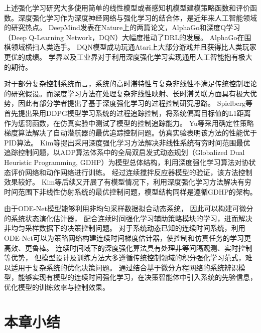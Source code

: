 上述强化学习研究大多使用简单的线性模型或者感知机模型建模策略函数和评价函数。深度强化学习作为深度神经网络与强化学习的结合体，是近年来人工智能领域的研究热点。
DeepMind发表在Nature上的两篇论文，AlphaGo\cite{silver2017mastering}和深度Q学习（Deep Q-Learning Network，DQN）\cite{mnih2015human}大幅度推动了DRL的发展。
AlphaGo在围棋领域横扫人类选手。
DQN模型成功玩通Atari上大部分游戏并且获得比人类玩家更优的成绩。
学界以及工业界对于利用深度强化学习实现通用人工智能抱有极大的期待。

对于部分复杂控制系统而言，系统的高时滞特性与复杂非线性不满足传统控制理论的研究假设。而深度学习方法在处理复杂非线性映射、长时滞关联方面具有极大优势，因此有部分学者提出了基于深度强化学习的过程控制研究思路。
Spielberg等\cite{7983780}首先提出采用DDPG模型学习系统的过程追踪控制，将系统偏离目标值的L1距离作为惩罚函数，在仿真实验中测试了模型的控制追踪能力。
Yu等\cite{yu2017deep}采用确定性策略梯度算法解决了自动潜航器的最优追踪控制问题。仿真实验表明该方法的性能优于PID算法。
Kim等\cite{kim2018deep}提出采用深度强化学习方法解决非线性系统有穷时间范围最优追踪控制问题，以ADP算法体系中的全局双启发式动态规划（Globalized Dual Heuristic Programming, GDHP）为模型总体结构，利用深度强化学习算法对协状态评价网络和动作网络进行训练。
经过连续搅拌反应器模型的验证，该方法控制效果较好。
Kim等\cite{kim2020model}后续又开展了有模型情况下，利用深度强化学习方法解决有穷时间范围下非线性仿射系统的最优控制问题，模型结构同样是遵循GDHP的架构。

由于ODE-Net模型能够利用非均匀采样数据拟合动态系统，
因此可以构建可微分的系统状态演化估计器，
配合连续时间强化学习辅助策略模块的学习，进而解决非均匀采样数据下的决策控制问题\cite{Yildiz2021}。
对于系统动态已知的连续时间系统，利用ODE-Net可以为策略网络构建连续时间梯度估计器\cite{Ainsworth2020}，使控制和仿真任务的学习更高效、更鲁棒。
连续时间域下的深度强化算法具有处理非等间隔观测、实时控制等优势，
但模型设计及训练方法大多遵循传统控制领域的积分强化学习范式，难以适用于复杂系统的优化决策问题。
通过结合基于微分方程网络的系统辨识模型，能够实现有模型的连续时间强化学习，在决策智能体中引入系统的先验信息，优化模型的训练效率与控制效果。


\section{本章小结}


